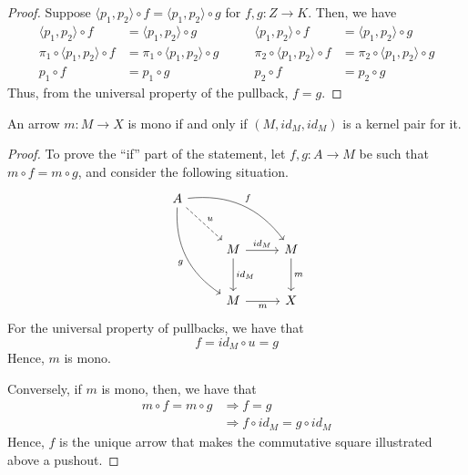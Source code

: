 \documentclass[runningheads,envcountsect]{llncs}
\begin{document}
\begin{proof}
	Suppose $\langle p_1, p_2 \rangle \circ f = \langle p_1, p_2 \rangle \circ g$ for $f, g: Z \to K$. Then, we have
	\[
		\begin{split}
			\langle p_1, p_2 \rangle \circ f &=  \langle p_1, p_2 \rangle \circ g \\
			\pi_1 \circ \langle p_1, p_2 \rangle \circ f &=  \pi_1 \circ \langle p_1, p_2 \rangle \circ g \\
			p_1 \circ f &= p_1 \circ g
		\end{split}
		\qquad
		\begin{split}
			\langle p_1, p_2 \rangle \circ f &=  \langle p_1, p_2 \rangle \circ g \\
			\pi_2 \circ \langle p_1, p_2 \rangle \circ f &=  \pi_2 \circ \langle p_1, p_2 \rangle \circ g \\
			p_2 \circ f &= p_2 \circ g
		\end{split}
	\]
	Thus, from the universal property of the pullback, $f = g$.
\end{proof}

\begin{proposition}\label{prop:kermono}
	An arrow $m\colon M\to X$ is mono if and only if $(M, id_M, id_M)$ is a kernel pair for it.
\end{proposition}

\begin{proof}
    To prove the ``if'' part of the statement, let $f, g: A \to M$ be such that $m\circ f = m\circ g$, and consider the following situation.
    \[
        \begin{tikzcd}[row sep=26, column sep = 26]
        A \arrow[drr, bend left=30, "f"] \arrow[ddr, bend right=30,"g" swap] \arrow[dr, dashed, "u"] & & \\
        & M  \arrow[d, "{id_M}"] \arrow[r, "{id_M}"] & M \arrow[d, "m"] \\
        & M  \arrow[r, "m" swap] & X
        \end{tikzcd}
    \]
    For the universal property of pullbacks, we have that $$f  =  id_M \circ u =  g$$
    Hence, $m$ is mono.

    Conversely, if $m$ is mono, then, we have that
    \begin{align*}
        m \circ f = m \circ g   &\Rightarrow    f = g \\
                                &\Rightarrow    f \circ id_M = g\circ id_M
    \end{align*}
    Hence, $f$ is the unique arrow that makes the commutative square illustrated above a pushout.
\end{proof}
\end{document}
